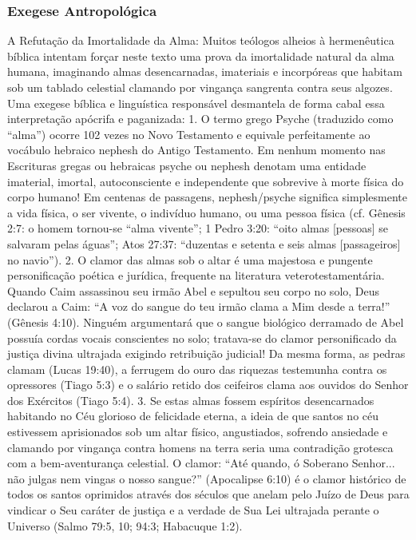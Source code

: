 \subsubsection*{Exegese Antropológica}
A Refutação da Imortalidade da Alma:
Muitos teólogos alheios à hermenêutica bíblica intentam forçar neste texto uma prova da imortalidade natural da alma humana, imaginando almas desencarnadas, imateriais e incorpóreas que habitam sob um tablado celestial clamando por vingança sangrenta contra seus algozes. Uma exegese bíblica e linguística responsável desmantela de forma cabal essa interpretação apócrifa e paganizada:
1. O termo grego Psyche (traduzido como ``alma'') ocorre 102 vezes no Novo Testamento e equivale perfeitamente ao vocábulo hebraico nephesh do Antigo Testamento. Em nenhum momento nas Escrituras gregas ou hebraicas psyche ou nephesh denotam uma entidade imaterial, imortal, autoconsciente e independente que sobrevive à morte física do corpo humano! Em centenas de passagens, nephesh/psyche significa simplesmente a vida física, o ser vivente, o indivíduo humano, ou uma pessoa física (cf. Gênesis 2:7: o homem tornou-se ``alma vivente''; 1 Pedro 3:20: ``oito almas [pessoas] se salvaram pelas águas''; Atos 27:37: ``duzentas e setenta e seis almas [passageiros] no navio'').
2. O clamor das almas sob o altar é uma majestosa e pungente personificação poética e jurídica, frequente na literatura veterotestamentária. Quando Caim assassinou seu irmão Abel e sepultou seu corpo no solo, Deus declarou a Caim: ``A voz do sangue do teu irmão clama a Mim desde a terra!'' (Gênesis 4:10). Ninguém argumentará que o sangue biológico derramado de Abel possuía cordas vocais conscientes no solo; tratava-se do clamor personificado da justiça divina ultrajada exigindo retribuição judicial! Da mesma forma, as pedras clamam (Lucas 19:40), a ferrugem do ouro das riquezas testemunha contra os opressores (Tiago 5:3) e o salário retido dos ceifeiros clama aos ouvidos do Senhor dos Exércitos (Tiago 5:4).
3. Se estas almas fossem espíritos desencarnados habitando no Céu glorioso de felicidade eterna, a ideia de que santos no céu estivessem aprisionados sob um altar físico, angustiados, sofrendo ansiedade e clamando por vingança contra homens na terra seria uma contradição grotesca com a bem-aventurança celestial. O clamor: ``Até quando, ó Soberano Senhor... não julgas nem vingas o nosso sangue?'' (Apocalipse 6:10) é o clamor histórico de todos os santos oprimidos através dos séculos que anelam pelo Juízo de Deus para vindicar o Seu caráter de justiça e a verdade de Sua Lei ultrajada perante o Universo (Salmo 79:5, 10; 94:3; Habacuque 1:2).


